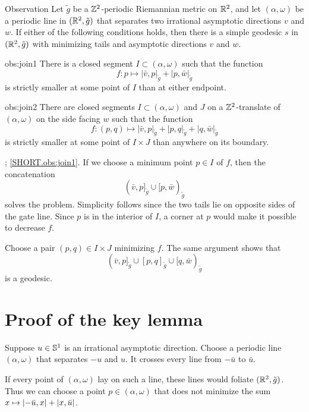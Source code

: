 \documentclass[a4paper,10pt]{article}
\begin{document}
\begin{thm}{Observation}\label{obs:join}
Let $\tilde g$ be a $\mathbb{Z}^2$-periodic Riemannian metric on $\mathbb{R}^2$,
and let $(\alpha,\omega)$ be a periodic line in $(\mathbb{R}^2,\tilde g)$ that separates two irrational asymptotic directions $v$ and $w$.
If either of the following conditions holds, then there is a simple geodesic $s$ in $(\mathbb{R}^2,\tilde g)$ with minimizing tails and asymptotic directions $v$ and $w$.

\begin{subthm}{obs:join1}
There is a closed segment $I\subset (\alpha,\omega)$ such that the function
\[f\colon p\mapsto |\bar v,p|_{\tilde g}+|p,\bar w|_{\tilde g}\]
is strictly smaller at some point of $I$ than at either endpoint.
\end{subthm}

\begin{subthm}{obs:join2}\label{obs:main2}
There are closed segments $I\subset (\alpha,\omega)$ and $J$ on a $\mathbb{Z}^2$-translate of $(\alpha,\omega)$ on the side facing $w$
such that the function
\[f\colon (p,q)\mapsto |\bar v,p|_{\tilde g}+|p,q|_{\tilde g}+|q,\bar w|_{\tilde g}\]
is strictly smaller at some point of $I\times J$ than anywhere on its boundary.
\end{subthm}

\end{thm}

; \ref{SHORT.obs:join1}.
If we choose a minimum point $p\in I$ of $f$,
then the concatenation
\[(\bar v,p]_{\tilde g}\cup[p,\bar w)_{\tilde g}\]
solves the problem.
Simplicity follows since the two tails lie on opposite sides of the gate line.
Since $p$ is in the interior of $I$, a corner at $p$ would make it possible to decrease $f$.

Choose a pair $(p,q)\in I\times J$ minimizing $f$.
The same argument shows that
\[(\bar v,p]_{\tilde g}\cup[p,q]_{\tilde g}\cup[q,\bar w)_{\tilde g}\]
is a geodesic.
\qeds

\section{Proof of the key lemma}

Suppose $u\in\mathbb{S}^1$ is an irrational asymptotic direction.
Choose a periodic line $(\alpha,\omega)$ that separates $-u$ and $u$.
It crosses every line from $-\bar u$ to $\bar u$.

If every point of $(\alpha,\omega)$ lay on such a line, these lines would foliate $(\mathbb{R}^2,\tilde g)$.
Thus we can choose a point $p\in (\alpha,\omega)$ that does not minimize the sum $x\z\mapsto |{-}\bar u,x|+|x,\bar u|$.
\end{document}
